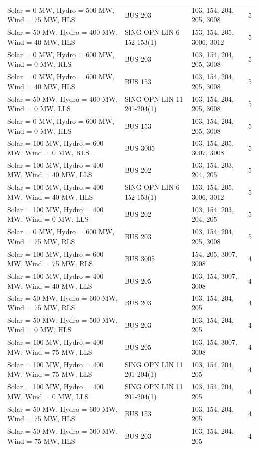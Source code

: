 \documentclass[10pt]{report}
\begin{document}
\begin{table}[H]
{\begin{tabular}{llp{8cm}r}
Solar = 0 MW, Hydro = 500 MW, Wind = 75 MW, HLS & BUS 203 & 103, 154, 204, 205, 3008 & 5 \\
Solar = 50 MW, Hydro = 400 MW, Wind = 40 MW, HLS & SING OPN LIN   6 152-153(1) & 153, 154, 205, 3006, 3012 & 5 \\
Solar = 0 MW, Hydro = 600 MW, Wind = 0 MW, RLS & BUS 203 & 103, 154, 204, 205, 3008 & 5 \\
Solar = 0 MW, Hydro = 600 MW, Wind = 40 MW, HLS & BUS 153 & 103, 154, 204, 205, 3008 & 5 \\
Solar = 50 MW, Hydro = 400 MW, Wind = 0 MW, LLS & SING OPN LIN   11 201-204(1) & 103, 154, 204, 205, 3008 & 5 \\
Solar = 0 MW, Hydro = 600 MW, Wind = 0 MW, HLS & BUS 153 & 103, 154, 204, 205, 3008 & 5 \\
Solar = 100 MW, Hydro = 600 MW, Wind = 0 MW, RLS & BUS 3005 & 103, 154, 205, 3007, 3008 & 5 \\
Solar = 100 MW, Hydro = 400 MW, Wind = 40 MW, LLS & BUS 202 & 103, 154, 203, 204, 205 & 5 \\
Solar = 100 MW, Hydro = 400 MW, Wind = 40 MW, HLS & SING OPN LIN   6 152-153(1) & 153, 154, 205, 3006, 3012 & 5 \\
Solar = 100 MW, Hydro = 400 MW, Wind = 0 MW, LLS & BUS 202 & 103, 154, 203, 204, 205 & 5 \\
Solar = 0 MW, Hydro = 600 MW, Wind = 75 MW, RLS & BUS 203 & 103, 154, 204, 205, 3008 & 5 \\
Solar = 100 MW, Hydro = 600 MW, Wind = 75 MW, RLS & BUS 3005 & 154, 205, 3007, 3008 & 4 \\
Solar = 100 MW, Hydro = 400 MW, Wind = 40 MW, LLS & BUS 205 & 103, 154, 3007, 3008 & 4 \\
Solar = 50 MW, Hydro = 600 MW, Wind = 75 MW, RLS & BUS 203 & 103, 154, 204, 205 & 4 \\
Solar = 50 MW, Hydro = 500 MW, Wind = 0 MW, HLS & BUS 203 & 103, 154, 204, 205 & 4 \\
Solar = 100 MW, Hydro = 400 MW, Wind = 75 MW, LLS & BUS 205 & 103, 154, 3007, 3008 & 4 \\
Solar = 100 MW, Hydro = 400 MW, Wind = 75 MW, LLS & SING OPN LIN   11 201-204(1) & 103, 154, 204, 205 & 4 \\
Solar = 100 MW, Hydro = 400 MW, Wind = 0 MW, LLS & SING OPN LIN   11 201-204(1) & 103, 154, 204, 205 & 4 \\
Solar = 50 MW, Hydro = 600 MW, Wind = 75 MW, HLS & BUS 153 & 103, 154, 204, 205 & 4 \\
Solar = 50 MW, Hydro = 500 MW, Wind = 75 MW, HLS & BUS 203 & 103, 154, 204, 205 & 4 \\

\end{tabular}}
\end{table}
\end{document}
